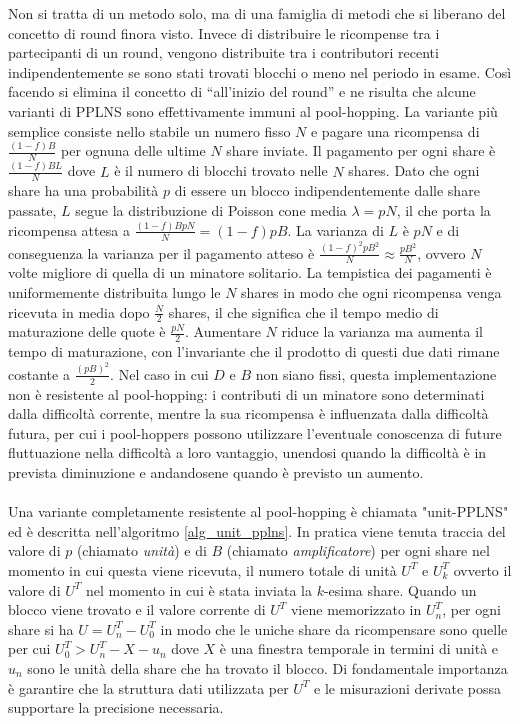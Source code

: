 Non si tratta di un metodo solo, ma di una famiglia di metodi che si liberano del concetto di round finora visto.
Invece di distribuire le ricompense tra i partecipanti di un round, vengono distribuite tra i contributori recenti indipendentemente se sono stati trovati blocchi o meno nel periodo in esame. Così facendo si elimina il concetto di ``all'inizio del round'' e ne risulta che alcune varianti di PPLNS sono effettivamente immuni al pool-hopping.
La variante più semplice consiste nello stabile un numero fisso $N$ e pagare una ricompensa di $\frac{(1-f)B}{N}$ per ognuna delle ultime $N$ share inviate. Il pagamento per ogni share è $\frac{(1-f)BL}{N}$ dove $L$ è il numero di blocchi trovato nelle $N$ shares. Dato che ogni share ha una probabilità $p$ di essere un blocco indipendentemente dalle share passate, $L$ segue la distribuzione di Poisson cone media $\lambda = pN$, il che porta la ricompensa attesa a $\frac{(1-f)BpN}{N} = (1-f)pB$. La varianza di $L$ è $pN$ e di conseguenza la varianza per il pagamento atteso è $\frac{(1-f)^2 pB^2}{N} \approx \frac{pB^2}{N}$, ovvero $N$ volte migliore di quella di un minatore solitario.
La tempistica dei pagamenti è uniformemente distribuita lungo le $N$ shares in modo che ogni ricompensa venga ricevuta in media dopo $\frac{N}{2}$ shares, il che significa che il tempo medio di maturazione delle quote è $\frac{pN}{2}$. Aumentare $N$ riduce la varianza ma aumenta il tempo di maturazione, con l'invariante che il prodotto di questi due dati rimane costante a $\frac{(pB)^2}{2}$.
Nel caso in cui $D$ e $B$ non siano fissi, questa implementazione non è resistente al pool-hopping: i contributi di un minatore sono determinati dalla difficoltà corrente, mentre la sua ricompensa è influenzata dalla difficoltà futura, per cui i pool-hoppers possono utilizzare l'eventuale conoscenza di future fluttuazione nella difficoltà a loro vantaggio, unendosi quando la difficoltà è in prevista diminuzione e andandosene quando è previsto un aumento.\\\\
Una variante completamente resistente al pool-hopping è chiamata "unit-PPLNS" ed è descritta nell'algoritmo \ref{alg_unit_pplns}. In pratica viene tenuta traccia del valore di $p$ (chiamato \emph{unità}) e di $B$ (chiamato \emph{amplificatore}) per ogni share nel momento in cui questa viene ricevuta, il numero totale di unità $U^T$ e $U^T_k$ ovverto il valore di $U^T$ nel momento in cui è stata inviata la $k$-esima share.
Quando un blocco viene trovato e il valore corrente di $U^T$ viene memorizzato in $U^T_n$, per ogni share si ha $U=U^T_n - U^T_0$ in modo che le uniche share da ricompensare sono quelle per cui $U^T_0 > U^T_n - X -u_n$ dove $X$ è una finestra temporale in termini di unità e $u_n$ sono le unità della share che ha trovato il blocco. Di fondamentale importanza è garantire che la struttura dati utilizzata per $U^T$ e le misurazioni derivate possa supportare la precisione necessaria.
